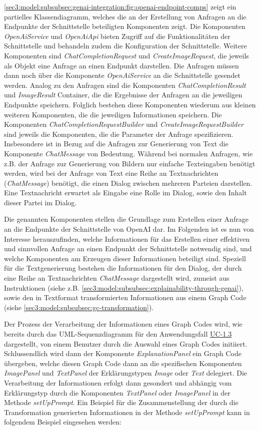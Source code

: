 \cref{sec3:model:subsubsec:genai-integration:fig:openai-endpoint-comps} zeigt ein partielles Klassendiagramm, welches die an der Erstellung von Anfragen an die Endpunkte der Schnittstelle beteiligten Komponenten zeigt.
Die Komponenten \textit{OpenAiService} und \textit{OpenAiApi} bieten Zugriff auf die Funktionalitäten der Schnittstelle und behandeln zudem die Konfiguration der Schnittstelle.
Weitere Komponenten sind \textit{ChatCompletionRequest} und \textit{CreateImageRequest}, die jeweils als Objekt eine Anfrage an einen Endpunkt darstellen.
Die Anfragen müssen dann noch über die Komponente \textit{OpenAiService} an die Schnittstelle gesendet werden.
Analog zu den Anfragen sind die Komponenten \textit{ChatCompletionResult} und \textit{ImageResult} Container, die die Ergebnisse der Anfragen an die jeweiligen Endpunkte speichern.
Folglich bestehen diese Komponenten wiederum aus kleinen weiteren Komponenten, die die jeweiligen Informationen speichern.
Die Komponenten \textit{ChatCompletionRequestBuilder} und \textit{CreateImageRequestBuilder} sind jeweils die Komponenten, die die Parameter der Anfrage spezifizieren.
Insbesondere ist in Bezug auf die Anfragen zur Generierung von Text die Komponente \textit{ChatMessage} von Bedeutung.
Während bei normalen Anfragen, wie z.B. der Anfrage zur Generierung von Bildern nur einfache Texteingaben benötigt werden, wird bei der Anfrage von Text eine Reihe an Textnachrichten (\textit{ChatMessage}) benötigt, die einen Dialog zwischen mehreren Parteien darstellen.
Eine Textnachricht erwartet als Eingabe eine Rolle im Dialog, sowie den Inhalt dieser Partei im Dialog.

Die genannten Komponenten stellen die Grundlage zum Erstellen einer Anfrage an die Endpunkte der Schnittstelle von OpenAI dar.
Im Folgenden ist es nun von Interesse herauszufinden, welche Informationen für das Erstellen einer effektiven und sinnvollen Anfrage an einen Endpunkt der Schnittstelle notwendig sind, und welche Komponenten am Erzeugen dieser Informationen beteiligt sind.
Speziell für die Textgenerierung bestehen die Informationen für den Dialog, der durch eine Reihe an Textnachrichten \textit{ChatMessage} dargestellt wird, zumeist aus Instruktionen (siehe z.B. \cref{sec3:model:subsubsec:explainability-through-genai}), sowie den in Textformat transformierten Informationen aus einem Graph Code (siehe \cref{sec3:model:subsubsec:gc-transformation}).

Der Prozess der Verarbeitung der Informationen eines Graph Codes wird, wie bereits durch das UML-Sequenzdiagramm für den Anwendungsfall \hyperref[sec3:model:uc-1.3]{UC-1.3} dargestellt, von einem Benutzer durch die Auswahl eines Graph Codes initiiert.
Schlussendlich wird dann der Komponente \textit{ExplanationPanel} ein Graph Code übergeben, welche diesen Graph Code dann an die spezifischen Komponenten \textit{ImagePanel} und \textit{TextPanel} der Erklärungstypen \textit{Image} oder \textit{Text} delegiert.
Die Verarbeitung der Informationen erfolgt dann gesondert und abhängig vom Erklärungstyp durch die Komponenten \textit{TextPanel} oder \textit{ImagePanel} in der Methode \textit{setUpPrompt}.
Ein Beispiel für die Zusammenstellung der durch die Transformation generierten Informationen in der Methode \textit{setUpPrompt} kann in folgendem Beispiel eingesehen werden:

